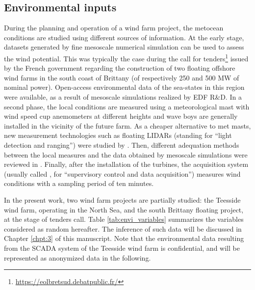 \subsection{Environmental inputs}

During the planning and operation of a wind farm project, the metocean conditions are studied using different sources of information. 
At the early stage, datasets generated by fine mesoscale numerical simulation can be used to assess the wind potential. 
This was typically the case during the call for tenders\footnote{\url{https://eolbretsud.debatpublic.fr/}} issued by the French government regarding the construction of two floating offshore wind farms in the south coast of Brittany (of respectively 250 and 500 MW of nominal power). 
Open-access environmental data of the sea-states in this region were available, as a result of mesoscale simulations \citep{raoult_2018_anemoc3} realized by EDF R\&D.    
In a second phase, the local conditions are measured using a meteorological mast with wind speed cup anemometers at different heights and wave boys are generally installed in the vicinity of the future farm. 
As a cheaper alternative to met masts, new measurement technologies such as floating LIDARs (standing for ``light detection and ranging'') were studied by \citet{gottschall_2017_floating_LIDAR}. 
Then, different adequation methods between the local measures and the data obtained by mesoscale simulations were reviewed in \citet{sempreviva_2008_wind_assessment_review}.  
Finally, after the installation of the turbines, the acquisition system (usually called , for ``supervisory control and data acquisition'') measures wind conditions with a sampling period of ten minutes. 

In the present work, two wind farm projects are partially studied: the Teesside wind farm, operating in the North Sea, and the south Brittany floating project, at the stage of tenders call. 
Table \ref{tab:envi_variables} summarizes the variables considered as random hereafter. 
The inference of such data will be discussed in Chapter \ref{chpt:3} of this manuscript. 
Note that the environmental data resulting from the SCADA system of the Teesside wind farm is confidential, and will be represented as anonymized data in the following. 

